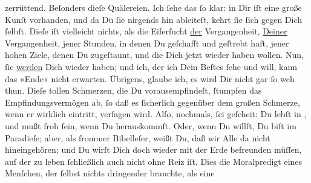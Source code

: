 \begin{ledgroupsized}[t]{13cm}
               zerrüttend. Beſonders dieſe Quälereien. Ich ſehe das ſo klar: in Dir iſt eine große
               Kunſt vorhanden, und da Du ſie nirgends hin ableiteſt, kehrt ſie ſich gegen Dich
               ſelbſt. Dieſe \label{K_L02649-22v}\label{K_L02649-22h}
               iſt vielleicht nichts, als die Eiferſucht \uline{der}
               Vergangenheit, \uline{Deiner} Vergangenheit, jener Stunden,
               in denen Du geſchafft und geſtrebt haſt, jener hohen Ziele, denen Du zugeſtaunt, und
               die Dich jetzt wieder haben wollen. Nun, ſie \uline{werden}
               Dich wieder haben; und ich, der ich Dein Beſtes ſehe und will, kann das »Ende« nicht
               erwarten. Übrigens, glaube ich, es wird Dir nicht gar ſo weh thun. Dieſe tollen
               Schmerzen, die Du vorausempfindeſt, {\pb}ſtumpfen das
               Empfindungsvermögen ab, ſo daß es ſicherlich gegenüber dem großen Schmerze, wenn er
               wirklich eintritt, verſagen wird. Alſo, nochmals, ſei geſcheit: Du lebſt in \label{K_L02649-7v}\label{K_L02649-7h},
               und mußt ſroh ſein, wenn Du herauskommſt. Oder, wenn Du willſt, Du biſt im Paradieſe;
               aber, als ſrommer Bibelleſer,  weißt Du, daß wir Alle da nicht hineingehören; und Du wirſt Dich doch wieder
               mit der Erde befreunden müſſen, auf der zu leben ſchließlich auch nicht ohne Reiz
               iſt.\pend
           \pstart
           Dies die Moralpredigt eines Menſchen, der ſelbst nichts dringender brauchte, als eine

\end{ledgroupsized}
